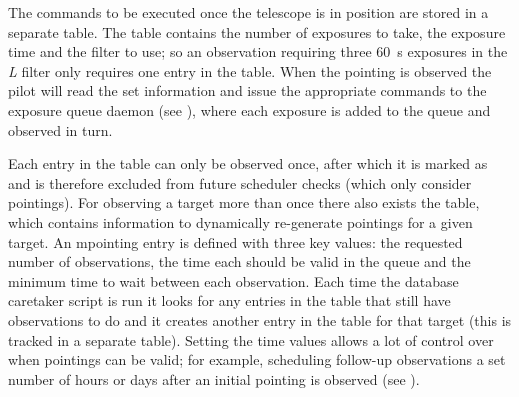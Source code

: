 \begin{colsection}
The commands to be executed once the telescope is in position are stored in a separate  table. The table contains the number of exposures to take, the exposure time and the filter to use; so an observation requiring three \SI{60}{\second} exposures in the \textit{L} filter only requires one entry in the table. When the pointing is observed the pilot will read the set information and issue the appropriate commands to the exposure queue daemon (see ), where each exposure is added to the queue and observed in turn.

\newpage

Each entry in the  table can only be observed once, after which it is marked as  and is therefore excluded from future scheduler checks (which only consider  pointings). For observing a target more than once there also exists the  table, which contains information to dynamically re-generate pointings for a given target. An mpointing entry is defined with three key values: the requested number of observations, the time each should be valid in the queue and the minimum time to wait between each observation. Each time the database caretaker script is run it looks for any entries in the  table that still have observations to do and it creates another entry in the  table for that target (this is tracked in a separate  table). Setting the time values allows a lot of control over when pointings can be valid; for example, scheduling follow-up observations a set number of hours or days after an initial pointing is observed (see ).


\end{colsection}
